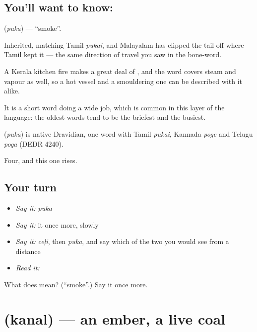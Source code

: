 \subsection*{You'll want to know: }
\textbf{} (\emph{puka}) — \textquotedblleft{}smoke\textquotedblright{}.

Inherited, matching Tamil \emph{pukai}, and Malayalam has clipped the tail off where Tamil kept it — the same direction of travel you saw in the bone-word.

A Kerala kitchen fire makes a great deal of , and the word covers steam and vapour as well, so a hot vessel and a smouldering one can be described with it alike.

It is a short word doing a wide job, which is common in this layer of the language: the oldest words tend to be the briefest and the busiest.

\begin{cousinweb}
\textbf{} (\emph{puka}) is native Dravidian, one word with Tamil \emph{pukai}, Kannada \emph{poge} and Telugu \emph{poga} (DEDR 4240).
\end{cousinweb}

\begin{grammarlens}[title={What you've built}]
Four, and this one rises.
\end{grammarlens}

\subsection*{Your turn}
\begin{itemize}
\raggedright
  \item \emph{Say it:} \emph{puka}
  \item \emph{Say it:} it once more, slowly
  \item \emph{Say it:} \emph{ceḷi}, then \emph{puka}, and say which of the two you would see from a distance
  \item \emph{Read it:} \textbf{}
\end{itemize}

\begin{tcolorbox}[breakable,colback=teal!4,colframe=teal!35!black,title={Before you move on}]
What does  mean? (\textquotedblleft{}smoke\textquotedblright{}.) Say it once more.
\end{tcolorbox}
\section[\texorpdfstring{\ml{കനൽ} (kanal)}{കനൽ (kanal)}]{ (kanal) — an ember, a live coal}

